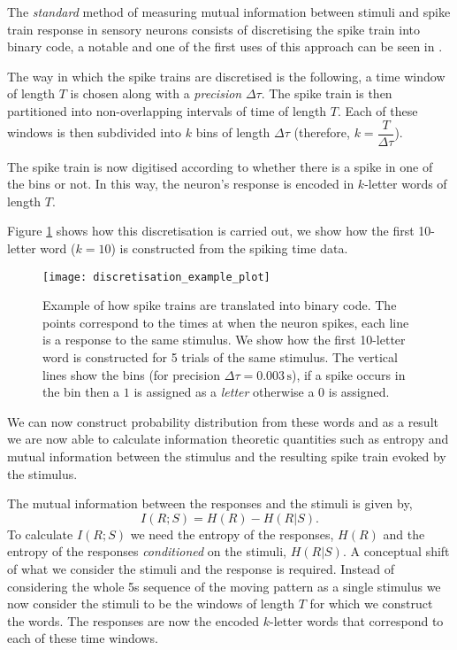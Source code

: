 \documentclass[10pt,a4paper]{book}
\begin{document}
The \emph{standard} method of measuring mutual information between stimuli and spike train response in sensory neurons consists of discretising the spike train into binary code, a notable and one of the first uses of this approach can be seen in \cite{deRuyter97}.

The way in which the spike trains are discretised is the following, a time window of length $T$ is chosen along with a \emph{precision} $\Delta \tau$. The spike train is then partitioned into non-overlapping intervals of time of length $T$. Each of these windows is then subdivided into $k$ bins of length $\Delta \tau$ (therefore, $k = \dfrac{T}{\Delta \tau}$).

The spike train is now digitised according to whether there is a spike in one of the bins or not. In this way, the neuron's response is encoded in $k$-letter words of length $T$. 

Figure \ref{fig:discrete_example} shows how this discretisation is carried out, we show how the first 10-letter word ($k = 10$) is constructed from the spiking time data.

\begin{figure}
\begin{center}
\texttt{[image: discretisation\_example\_plot]}
\caption{Example of how spike trains are translated into binary code. The points correspond to the times at when the neuron spikes, each line is a response to the same stimulus. We show how the first 10-letter word is constructed for 5 trials of the same stimulus. The vertical lines show the bins (for precision $\Delta \tau = 0.003\,\text{s}$), if a spike occurs in the bin then a $1$ is assigned as a \emph{letter} otherwise a $0$ is assigned.}
\label{fig:discrete_example}
\end{center}
\end{figure}

We can now construct probability distribution from these words and as a result we are now able to calculate information theoretic quantities such as entropy and mutual information between the stimulus and the resulting spike train evoked by the stimulus.

The mutual information between the responses and the stimuli is given by,
\begin{equation}
I(R;S) = H(R) - H(R|S).
\end{equation}
%
To calculate $I(R;S)$ we need the entropy of the responses, $H(R)$ and the entropy of the responses \emph{conditioned} on the stimuli, $H(R|S)$. A conceptual shift of what we consider the stimuli and the response is required. Instead of considering the whole 5s sequence of the moving pattern as a single stimulus we now consider the stimuli to be the windows of length $T$ for which we construct the words. The responses are now the encoded $k$-letter words that correspond to each of these time windows.
\end{document}
